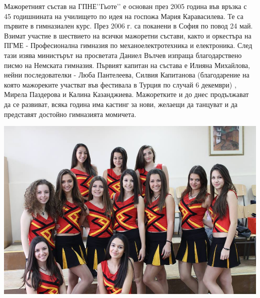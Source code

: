 \begin{multicols}{2}
Мажоретният състав на ГПНЕ’’Гьоте’’ е основан през 2005 година във връзка с 45 годишнината на училището по идея на госпожа Мария Каравасилева. Те са първите в гимназиален курс. През 2006 г. са поканени в София по повод 24 май. Взимат участие в шествието на всички мажоретни състави, както и оркестъра на ПГМЕ - 
Професионална гимназия по механоелектротехника и електроника. След тази изява министърът на просветата Даниел Вълчев изпраща благодарствено писмо на Немската гимназия. Първият капитан на състава е Илияна Михайлова, нейни последователки - 
Люба Пантелеева, Силвия Капитанова (благодарение на която мажореките участват във фестивала в Турция по случай 6 декември) , Мирела Паздерова и Калина Казанджиева. Мажоретките и до днес продължават да се развиват, всяка година има 
кастинг за нови, желаещи да танцуват и да представят достойно гимназията момичета.

\end{multicols}

\begin{center}
\includegraphics[width=6.1in]{./Magoretki/M.jpg}
\end{center}

\closearticle
